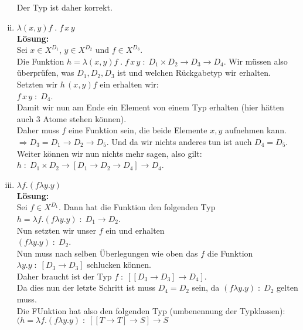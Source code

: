 \documentclass[11pt,a4paper,ngerman]{article}
\begin{document}
\begin{enumerate}[(i)]
         Der Typ ist daher korrekt.

   \item $\lambda (x , y) f \; . \; f \, x \, y$\\
      \textbf{Lösung:}\\
         Sei $x \in X^{D_1}$, $y \in X^{D_2}$ und $f \in X^{D_3}$.\\
         Die Funktion $h = \lambda (x,y)f \; . \; f \, x \, y \; : \; D_1 
         \times D_2 \rightarrow D_3 \rightarrow D_4$. Wir müssen also überprüfen,
         was $D_1,D_2,D_3$ ist und welchen Rückgabetyp wir erhalten.\\

         Setzten wir $h \, (x,y) f$ ein erhalten wir:\\
         $f \, x \, y \; : \; D_4$.\\
         Damit wir nun am Ende ein Element von einem Typ erhalten (hier hätten auch 3 Atome stehen können).\\
         Daher muss $f$ eine Funktion sein, die beide Elemente $x,y$ aufnehmen kann.\\
         $\Rightarrow D_3 = D_1 \rightarrow D_2 \rightarrow D_5$. Und da wir nichts anderes tun ist auch
         $D_4 = D_5$.\\
         Weiter können wir nun nichts mehr sagen, also gilt:\\
         $h \; : \; D_1 \times D_2 \rightarrow [D_1 \rightarrow D_2 \rightarrow D_4] \rightarrow D_4$.

\pagebreak

   \item $\lambda f. (f \lambda y.y)$\\
      \textbf{Lösung:}\\
         Sei $f \in X^{D_1}$. Dann hat die Funktion den folgenden Typ
         $h = \lambda f. (f \lambda y.y) \; : \; D_1 \rightarrow D_2$.\\

         Nun setzten wir unser $f$ ein und erhalten\\
         $(f \lambda y.y) \; : \; D_2$.\\
         Nun muss nach selben Überlegungen wie oben das $f$ die Funktion 
         $\lambda y.y \; : \; [D_3 \rightarrow D_3]$ schlucken können.\\
         
         Daher braucht ist der Typ $f \; : \; [ [D_3 \rightarrow D_3 ] \rightarrow D_4]$.\\
         Da dies nun der letzte Schritt ist muss $D_4 = D_2$ sein, 
         da $(f \lambda y.y) \; : \; D_2$ gelten muss.\\

         Die FUnktion hat also den folgenden Typ (umbenennung der Typklassen):\\
         $(h = \lambda f . (f \lambda y.y) \; : \; [[T \rightarrow T] \rightarrow S] \rightarrow S$

\end{enumerate}
\end{document}
